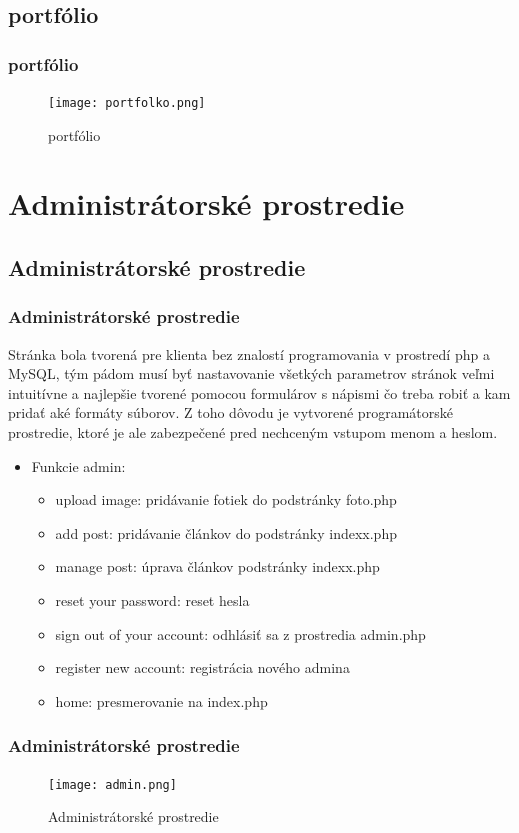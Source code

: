 \subsection{portfólio}
\begin{frame}\frametitle{portfólio}
  \begin{figure}[htb]
    \centering
    \texttt{[image: portfolko.png]}
    \caption{portfólio}
  \end{figure}

\end{frame}
\section{Administrátorské prostredie}
\subsection{Administrátorské prostredie}

\begin{frame}\frametitle{Administrátorské prostredie}
Stránka bola tvorená pre klienta bez znalostí programovania v prostredí php
a MySQL, tým pádom musí byť nastavovanie všetkých parametrov stránok veľmi intuitívne a najlepšie tvorené pomocou formulárov s nápismi čo treba robiť a kam pridať aké
formáty súborov. Z toho dôvodu je vytvorené programátorské prostredie, ktoré je ale zabezpečené pred nechceným vstupom menom a heslom.

 \begin{itemize}
 \item Funkcie admin:
           \begin{itemize}
          \item upload image: pridávanie fotiek do podstránky foto.php
          \item add post: pridávanie článkov do podstránky indexx.php
          \item manage post: úprava článkov podstránky indexx.php
          \item reset your password: reset hesla
          \item sign out of your account: odhlásiť sa z prostredia admin.php
          \item register new account: registrácia nového admina
          \item home: presmerovanie na index.php
         \end{itemize}
 \end{itemize}


\end{frame}

\begin{frame}\frametitle{Administrátorské prostredie}
  \begin{figure}[htb]
    \centering
    \texttt{[image: admin.png]}
    \caption{Administrátorské prostredie}
  \end{figure}
\end{frame}
